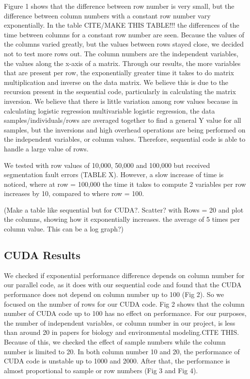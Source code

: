 \documentclass[letterpaper, 10 pt, conference]{ieeeconf}  %
\begin{document}
Figure 1 shows that the difference between row number is very small, but the difference between column numbers with a constant row number vary exponentially. In the table CITE/MAKE THIS TABLE!!! the differences of the time between columns for a constant row number are seen. Because the values of the columns varied greatly, but the values between rows stayed close, we decided not to test more rows out. The column numbers are the independent variables, the values along the x-axis of a matrix. Through our results, the more variables that are present per row, the exponentially greater time it takes to do matrix multiplication and inverse on the data matrix. We believe this is due to the recursion present in the sequential code, particularly in calculating the matrix inversion. We believe that there is little variation among row values because in calculating logistic regression multivariable logistic regression, the data samples/individuals/rows are averaged together to find a general Y value for all samples, but the inversions and high overhead operations are being performed on the independent variables, or column values. Therefore, sequential code is able to handle a large value of rows. 

We tested with row values of 10,000, 50,000 and 100,000 but received segmentation fault errors (TABLE X). However, a slow increase of time is noticed, where at row = 100,000 the time it takes to compute 2 variables per row increases by 10, compared to where row = 100. 

(Make a table like sequential but for CUDA?. Scatter? with Rows = 20 and plot the columns, showing how it exponentially increases. the average of 5 times per column value. This can be a log graph?)


\subsection{CUDA Results}

We checked if exponential performance difference depends on column number for our parallel code, as it does with our sequential code and found that the CUDA performance does not depend on column number up to 100 (Fig 2). So we focused on the number of rows for our CUDA code. Fig 2 shows that the column number of CUDA code up to 100 has no effect on performance. For our purposes, the number of independent variables, or column number in our project, is less than around 20 in papers for biology and environmental modeling.CITE THIS. Because of this, we checked the effect of sample numbers while the column number is limited to 20. In both column number 10 and 20, the performance of CUDA code is unstable up to 1000 and 2000. After that, the performance is almost proportional to sample or row numbers (Fig 3 and Fig 4).
\end{document}

